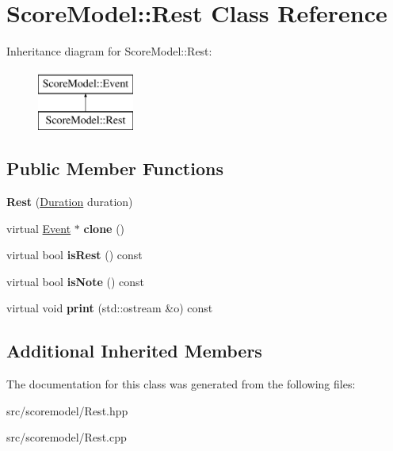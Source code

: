 \hypertarget{classScoreModel_1_1Rest}{}\section{Score\+Model\+::Rest Class Reference}
\label{classScoreModel_1_1Rest}
Inheritance diagram for Score\+Model\+::Rest\+:\begin{figure}[H]
\begin{center}
\leavevmode
\includegraphics[height=2.000000cm]{classScoreModel_1_1Rest}
\end{center}
\end{figure}
\subsection*{Public Member Functions}
\begin{DoxyCompactItemize}
\item 
\mbox{\label{classScoreModel_1_1Rest_a06c2c52454182970481d867119c2fe0d}} 
{\bfseries Rest} (\mbox{\hyperlink{classScoreModel_1_1Duration}{Duration}} duration)
\item 
\mbox{\label{classScoreModel_1_1Rest_af29f3806881fad7eb74254697144a411}} 
virtual \mbox{\hyperlink{classScoreModel_1_1Event}{Event}} $\ast$ {\bfseries clone} ()
\item 
\mbox{\label{classScoreModel_1_1Rest_a6ed1f8d8549c1f956ba1124ebcbc161a}} 
virtual bool {\bfseries is\+Rest} () const
\item 
\mbox{\label{classScoreModel_1_1Rest_a1adc1535dcdadaaeab92d396967f04de}} 
virtual bool {\bfseries is\+Note} () const
\item 
\mbox{\label{classScoreModel_1_1Rest_abfe8e08af480cea8f63c99ca454ee928}} 
virtual void {\bfseries print} (std\+::ostream \&o) const
\end{DoxyCompactItemize}
\subsection*{Additional Inherited Members}


The documentation for this class was generated from the following files\+:\begin{DoxyCompactItemize}
\item 
src/scoremodel/Rest.\+hpp\item 
src/scoremodel/Rest.\+cpp\end{DoxyCompactItemize}
